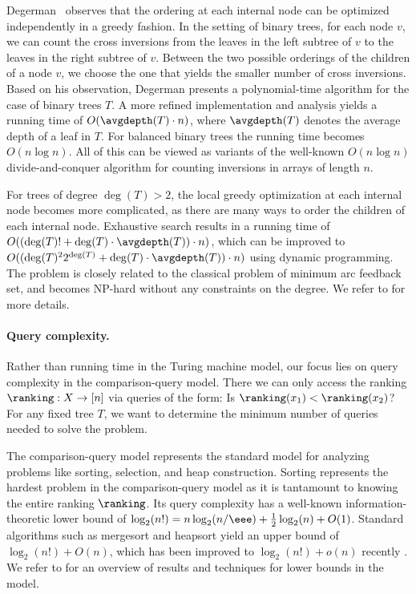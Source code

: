 \documentclass{toc}
\begin{document}
Degerman~\cite{Degerman1982} observes that the ordering at each internal node can be optimized %
%
independently in a greedy fashion. In the setting of binary trees, for each node $v$, we can count the cross inversions from the leaves in the left subtree of $v$ to the leaves in the right subtree of $v$. Between the two possible orderings of the children of a node $v$, we choose the one that yields the smaller number of cross inversions. 
Based on his observation, Degerman presents a polynomial-time algorithm for the case of binary trees $T$. A more refined implementation and analysis yields a running time of $O(\avgdepth(T) \cdot n)$, where $\avgdepth(T)$ denotes the average depth of a leaf in $T$. For balanced binary trees the running time becomes $O(n \log n)$. All of this can be viewed as variants of the well-known $O(n \log n)$ divide-and-conquer algorithm for counting inversions in arrays of length $n$.

For trees of degree $\deg(T) > 2$, the local greedy optimization at each internal node becomes more complicated, as there are many ways to order the children of each internal node. Exhaustive search results in a running time of $O((\deg(T)! + \deg(T) \cdot \avgdepth(T)) \cdot n)$, which can be improved to $O((\deg(T)^2 2^{\deg(T)} + \deg(T) \cdot \avgdepth(T)) \cdot n)$ using dynamic programming. The problem is closely related to the classical problem of minimum arc feedback set, and becomes NP-hard without any constraints on the degree. We refer to  for more details.

\paragraph{Query complexity.}
Rather than running time in the Turing machine model, our focus lies on query complexity in the comparison-query model. There we can only access the ranking $\ranking: X \to [n]$ via queries of the form: Is $\ranking(x_1) < \ranking(x_2)$? For any fixed tree $T$, we want to determine the minimum number of queries needed to solve the problem. 

The comparison-query model represents the standard model for analyzing problems like sorting, selection, and heap construction. Sorting represents the hardest problem in the comparison-query model as it is tantamount to knowing the entire ranking $\ranking$. Its query complexity has a well-known information-theoretic lower bound of $\log_2(n!) = n \log_2(n/\eee) + \frac{1}{2} \log_2(n) + O(1)$. Standard algorithms such as mergesort and heapsort yield an upper bound of $\log_2(n!) + O(n)$, which has been improved to $\log_2(n!) + o(n)$ recently \cite{Sergeev2020}.
We refer to  for an overview of results and techniques for lower bounds in the model.
\end{document}
